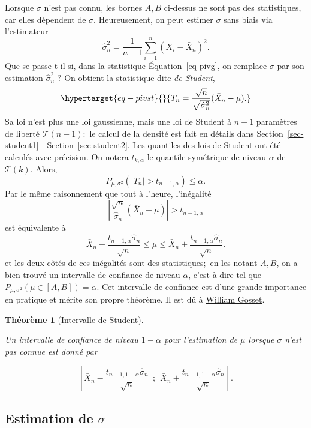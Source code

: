 \documentclass[
  10,
  letterpaper,
  DIV=11,
  numbers=noendperiod]{scrreport}
\theoremstyle{plain}
\newtheorem{theorem}{Théorème}[chapter]
\theoremstyle{definition}
\theoremstyle{plain}
\theoremstyle{definition}
\theoremstyle{definition}
\theoremstyle{plain}
\theoremstyle{remark}
\begin{document}
Lorsque \(\sigma\) n'est pas connu, les bornes \(A,B\) ci-dessus ne sont
pas des statistiques, car elles dépendent de \(\sigma\). Heureusement,
on peut estimer \(\sigma\) sans biais via l'estimateur
\[ \hat{\sigma}_n^2 = \frac{1}{n-1}\sum_{i=1}^n (X_i - \bar{X}_n)^2.\]
Que se passe-t-il si, dans la statistique Équation~\ref{eq-pivg}, on
remplace \(\sigma\) par son estimation \(\hat{\sigma}_n^2\) ? On obtient
la statistique dite \emph{de Student},
\begin{equation}\protect\hypertarget{eq-pivst}{}{T_n = \frac{\sqrt{n}}{\sqrt{\hat{\sigma}_n^2}}(\bar{X}_n - \mu).}\label{eq-pivst}\end{equation}
Sa loi n'est plus une loi gaussienne, mais une loi de Student à \(n-1\)
paramètres de liberté \(\mathscr{T}(n-1)\):~le calcul de la densité est
fait en détails dans Section~\ref{sec-student1} -
Section~\ref{sec-student2}. Les quantiles des lois de Student ont été
calculés avec précision. On notera \(t_{k,\alpha}\) le quantile
symétrique de niveau \(\alpha\) de \(\mathscr{T}(k)\). Alors,
\[ P_{\mu, \sigma^2}(|T_n|> t_{n-1,\alpha})\leqslant \alpha .\] Par le
même raisonnement que tout à l'heure, l'inégalité
\[ \left|\frac{\sqrt{n}}{\hat{\sigma}_n}(\bar{X}_n - \mu)\right| > t_{n-1,\alpha}\]
est équivalente à
\[ \bar{X}_n - \frac{t_{n-1,\alpha}\hat{\sigma}_n}{\sqrt{n}} \leqslant \mu \leqslant \bar{X}_n + \frac{t_{n-1,\alpha}\hat{\sigma}_n}{\sqrt{n}}.\]
et les deux côtés de ces inégalités sont des statistiques;~en les notant
\(A,B\), on a bien trouvé un intervalle de confiance de niveau
\(\alpha\), c'est-à-dire tel que
\(P_{\mu,\sigma^2}(\mu \in [A,B]) = \alpha\). Cet intervalle de
confiance est d'une grande importance en pratique et mérite son propre
théorème. Il est dû à
\href{https://en.wikipedia.org/wiki/William_Sealy_Gosset}{William
Gosset}.

\begin{theorem}[Intervalle de
Student]\protect\hypertarget{thm-icg}{}\label{thm-icg}

Un intervalle de confiance de niveau \(1-\alpha\) pour l'estimation de
\(\mu\) lorsque \(\sigma\) n'est pas connue est donné par

\[\left[\bar{X}_n - \frac{t_{n-1, 1-\alpha}\hat{\sigma}_n}{\sqrt{n}}~~;~~\bar{X}_n + \frac{t_{n-1, 1-\alpha}\hat{\sigma}_n}{\sqrt{n}} \right].\]

\end{theorem}

\hypertarget{estimation-de-sigma}{%
\subsection{\texorpdfstring{Estimation de
\(\sigma\)}{Estimation de \textbackslash sigma}}\label{estimation-de-sigma}}
\end{document}
